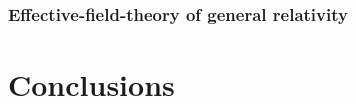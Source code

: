 \documentclass[twocolumn,prd,aps,superscriptaddress,preprintnumbers,tightenlines,showpacs,nofootinbib,amsfonts,amsmath,longbibliography]{revtex4-1}
\newcommand{\hs}[1]{{\textcolor{blue}{{[HS: #1]}} }}
\begin{document}
\subsubsection{Effective-field-theory of general relativity}
\label{sec:results_efts}

%

\section{Conclusions}
\label{sec:conclusions}

\end{document}
